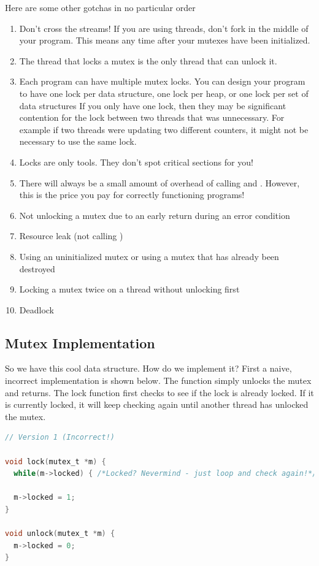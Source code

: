 Here are some other gotchas in no particular order
\begin{enumerate}
\item Don't cross the streams!
If you are using threads, don't fork in the middle of your program.
This means any time after your mutexes have been initialized.
\item The thread that locks a mutex is the only thread that can unlock it.
\item Each program can have multiple mutex locks.
  You can design your program to have one lock per data structure,
  one lock per heap,
  or one lock per set of data structures
  If you only have one lock, then they may be significant contention for the lock between two threads that was unnecessary.
  For example if two threads were updating two different counters, it might not be necessary to use the same lock.
\item Locks are only tools.
  They don't spot critical sections for you!
\item There will always be a small amount of overhead of calling  and .
However, this is the price you pay for correctly functioning programs!
\item
  Not unlocking a mutex due to an early return during an error condition
\item
  Resource leak (not calling )
\item
  Using an uninitialized mutex or using a mutex that has already been destroyed
\item
  Locking a mutex twice on a thread without unlocking first
\item
  Deadlock
\end{enumerate}

\subsection{Mutex Implementation}

So we have this cool data structure.
How do we implement it?
First a naive, incorrect implementation is shown below.
The  function simply unlocks the mutex and returns.
The lock function first checks to see if the lock is already locked.
If it is currently locked, it will keep checking again until another thread has unlocked the mutex.

\begin{lstlisting}[language=C]
// Version 1 (Incorrect!)

void lock(mutex_t *m) {
  while(m->locked) { /*Locked? Nevermind - just loop and check again!*/ }

  m->locked = 1;
}

void unlock(mutex_t *m) {
  m->locked = 0;
}
\end{lstlisting}

